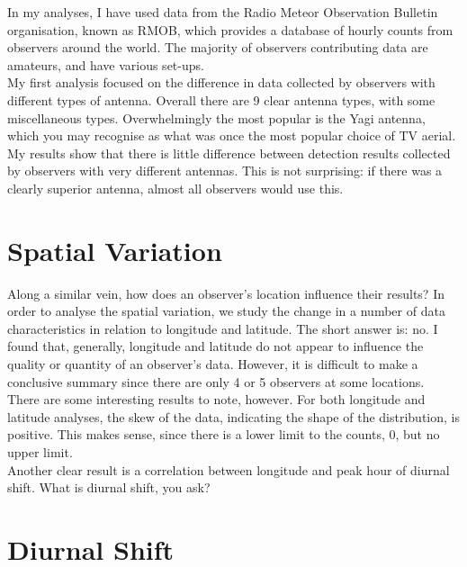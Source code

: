 \documentclass[12pt]{article}
\begin{document}
\large{
In my analyses, I have used data from the Radio Meteor Observation Bulletin
organisation, known as RMOB, which provides a database of hourly counts from
observers around the world. The majority of observers contributing data are 
amateurs, and have various set-ups. \\

My first analysis focused on the difference in data collected by
observers with different types of antenna. Overall there are 9 clear antenna
types, with some miscellaneous types. Overwhelmingly the most popular is the
Yagi antenna, which you may recognise as what was once the most popular choice
of TV aerial.\\

My results show that there is little difference between
detection results collected by observers with very different antennas. This is
not surprising: if there was a clearly superior antenna, almost all observers
would use this.  
}

\section{Spatial Variation}

\large{
Along a similar vein, how does an observer's location influence their results?
In order to analyse the spatial variation, we study the change in a number of
data characteristics in relation to longitude and latitude. The short answer
is: no. I found that, generally, longitude and latitude do not appear to
influence the quality or quantity of an observer's data. However, it is
difficult to make a conclusive summary since there are only 4 or 5 observers at
some locations. \\

There are some interesting results to note, however. For both longitude and
latitude analyses, the skew of the data, indicating the shape of the
distribution, is positive. This makes sense, since there is a lower limit to 
the counts, 0, but no upper limit. \\

Another clear result is a correlation between longitude and peak hour of
diurnal shift. What is diurnal shift, you ask?
}

\section{Diurnal Shift}
\end{document}

